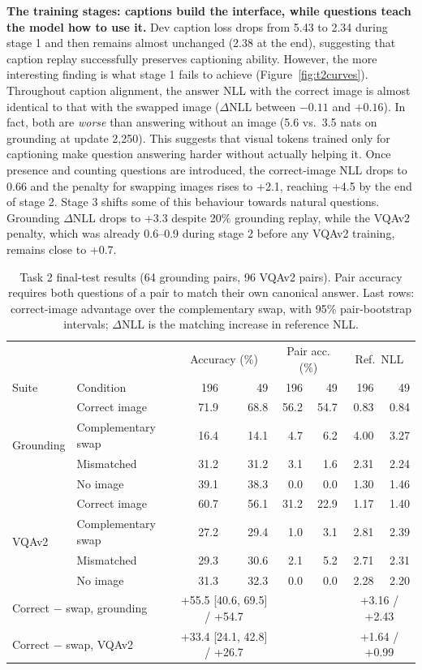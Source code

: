 \documentclass{article}
\begin{document}
\textbf{The training stages: captions build the interface, while questions teach the model how to use it.} Dev caption loss drops from 5.43 to 2.34 during stage 1 and then remains almost unchanged (2.38 at the end), suggesting that caption replay successfully preserves captioning ability. However, the more interesting finding is what stage 1 fails to achieve (Figure~\ref{fig:t2curves}). Throughout caption alignment, the answer NLL with the correct image is almost identical to that with the swapped image ($\Delta$NLL between $-0.11$ and $+0.16$). In fact, both are \emph{worse} than answering without an image (5.6 vs.\ 3.5 nats on grounding at update 2,250). This suggests that visual tokens trained only for captioning make question answering harder without actually helping it. Once presence and counting questions are introduced, the correct-image NLL drops to 0.66 and the penalty for swapping images rises to +2.1, reaching +4.5 by the end of stage 2. Stage 3 shifts some of this behaviour towards natural questions. Grounding $\Delta$NLL drops to +3.3 despite 20\% grounding replay, while the VQAv2 penalty, which was already 0.6--0.9 during stage 2 before any VQAv2 training, remains close to +0.7.

\begin{table}[t]
\caption{Task 2 final-test results (64 grounding pairs, 96 VQAv2 pairs). Pair accuracy requires both questions of a
pair to match their own canonical answer. Last rows: correct-image advantage over the complementary swap, with 95\%
pair-bootstrap intervals; $\Delta$NLL is the matching increase in reference NLL.}
\label{tab:t2main}
\centering
\footnotesize
\begin{tabular}{llrrrrrr}
\toprule
 & & \multicolumn{2}{c}{Accuracy (\%)} & \multicolumn{2}{c}{Pair acc. (\%)} & \multicolumn{2}{c}{Ref.\ NLL} \\
Suite & Condition & 196 & 49 & 196 & 49 & 196 & 49 \\
\midrule
\multirow{4}{*}{Grounding} & Correct image & 71.9 & 68.8 & 56.2 & 54.7 & 0.83 & 0.84 \\
 & Complementary swap & 16.4 & 14.1 & 4.7 & 6.2 & 4.00 & 3.27 \\
 & Mismatched & 31.2 & 31.2 & 3.1 & 1.6 & 2.31 & 2.24 \\
 & No image & 39.1 & 38.3 & 0.0 & 0.0 & 1.30 & 1.46 \\
\midrule
\multirow{4}{*}{VQAv2} & Correct image & 60.7 & 56.1 & 31.2 & 22.9 & 1.17 & 1.40 \\
 & Complementary swap & 27.2 & 29.4 & 1.0 & 3.1 & 2.81 & 2.39 \\
 & Mismatched & 29.3 & 30.6 & 2.1 & 5.2 & 2.71 & 2.31 \\
 & No image & 31.3 & 32.3 & 0.0 & 0.0 & 2.28 & 2.20 \\
\midrule
\multicolumn{2}{l}{Correct $-$ swap, grounding} & \multicolumn{2}{c}{+55.5 [40.6, 69.5] / +54.7} & & & \multicolumn{2}{c}{+3.16 / +2.43} \\
\multicolumn{2}{l}{Correct $-$ swap, VQAv2} & \multicolumn{2}{c}{+33.4 [24.1, 42.8] / +26.7} & & & \multicolumn{2}{c}{+1.64 / +0.99} \\
\bottomrule
\end{tabular}
\end{table}
\end{document}
